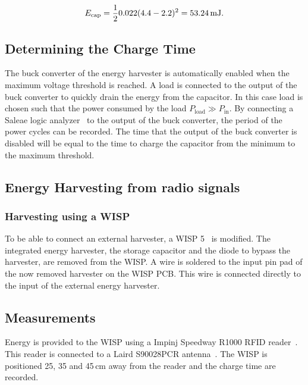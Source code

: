 \begin{equation}
\label{eq:cap2}
E_{\text{cap}} = \frac{1}{2} 0.022 (4.4 - 2.2)^2 = 53.24 \text{\,mJ}.
\end{equation}


\subsection{Determining the Charge Time}

The buck converter of the energy harvester is automatically enabled when the maximum voltage threshold is reached.
A load is connected to the output of the buck converter to quickly drain the energy from the capacitor.
In this case load is chosen such that the power consumed by the load $P_{\text{load}} \gg P_{\text{in}}$.
By connecting a Saleae logic analyzer~\cite{saleae_2017} to the output of the buck converter, the period of the power cycles can be recorded.
The time that the output of the buck converter is disabled will be equal to the time to charge the capacitor from the minimum to the maximum threshold.

\subsection{Energy Harvesting from radio signals}

\subsubsection{Harvesting using a WISP}
To be able to connect an external harvester, a WISP 5~\cite{sample_transim_2008} is modified.
The integrated energy harvester, the storage capacitor and the diode to bypass the harvester, are removed from the WISP.
A wire is soldered to the input pin pad of the now removed harvester on the WISP PCB.
This wire is connected directly to the input of the external energy harvester.

\subsection{Measurements}
Energy is provided to the WISP using a Impinj Speedway R1000 RFID reader~\cite{impinj_eol_2017, indy_r1000_2017}.
This reader is connected to a Laird S90028PCR antenna~\cite{laird_s9028pcr_2017}.
The WISP is positioned 25, 35 and 45\,cm away from the reader and the charge time are recorded.

